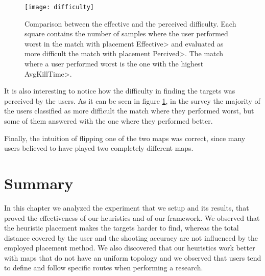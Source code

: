 \begin{figure}
\centering
\texttt{[image: difficulty]}
\caption[Comparison between the effective and the perceived difficulty.]{Comparison between the effective and the perceived difficulty. Each square contains the number of samples where the user performed worst in the match with placement \<Effective> and evaluated as more difficult the match with placement \<Percived>. The match where a user performed worst is the one with the highest \<AvgKillTime>.}
\label{img:percived} 
\end{figure}

It is also interesting to notice how the difficulty in finding the targets was perceived by the users. As it can be seen in figure \ref{img:percived}, in the survey the majority of the users classified as more difficult the match where they performed worst, but some of them answered with the one where they performed better. 

\par

Finally, the intuition of flipping one of the two maps was correct, since many users believed to have played two completely different maps. 


\section{Summary}

In this chapter we analyzed the experiment that we setup and its results, that proved the effectiveness of our heuristics and of our framework. We observed that the heuristic placement makes the targets harder to find, whereas the total distance covered by the user and the shooting accuracy are not influenced by the employed placement method. We also discovered that our heuristics work better with maps that do not have an uniform topology and we observed that users tend to define and follow specific routes when performing a research.